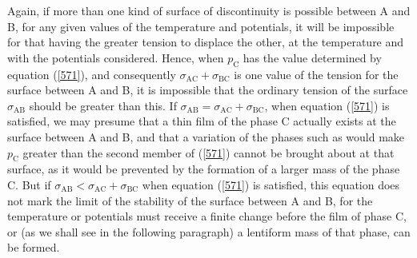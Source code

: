 \documentclass[12pt]{article}
\begin{document}
{Again, if more than one kind of surface of discontinuity is possible between A and B, for any given values of the temperature and potentials, it will be impossible for that having the greater tension to displace the other, at the temperature and with the potentials considered. Hence, when $p_{\text{C}}$ has the value determined by equation (\ref{571}), and consequently $\sigma_{\text{AC}}+ \sigma_{\text{BC}}$ is one value of the tension for the surface between A and B, it is impossible that the ordinary tension of the surface $\sigma_{\text{AB}}$ should be greater than this.  If $\sigma_{\text{AB}}=\sigma_{\text{AC}}+ \sigma_{\text{BC}}$, when equation (\ref{571}) is satisfied, we may presume that a thin film of the phase C actually exists at the surface between A and B, and that a variation of the phases such as would make $p_{\text{C}}$ greater than the second member of (\ref{571}) cannot be brought about at that surface, as it would be prevented by the formation of a larger mass of the phase C. But if $\sigma_{\text{AB}}<\sigma_{\text{AC}}+ \sigma_{\text{BC}}$ when equation (\ref{571}) is satisfied, this equation does not mark the limit of the stability of the surface between A and B, for the temperature or potentials must receive a finite change before the film of phase C, or (as we shall see in the following paragraph) a lentiform mass of that phase, can be formed.

}
\end{document}
